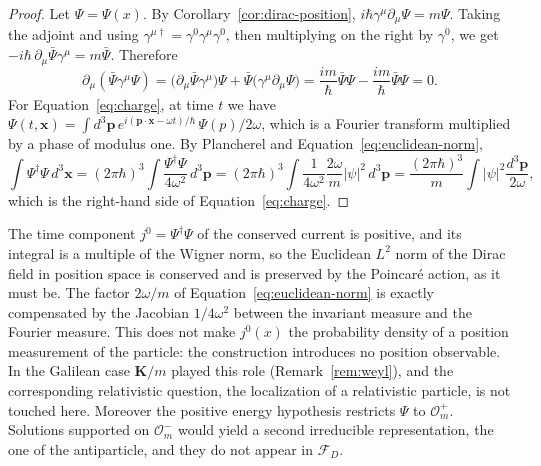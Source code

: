 	\begin{proof}
		Let $\Psi=\Psi(x)$. By Corollary~\ref{cor:dirac-position}, $i\hbar\gamma^\mu\partial_\mu\Psi=m\Psi$. Taking the adjoint and using $\gamma^{\mu\dagger}=\gamma^0\gamma^\mu\gamma^0$, then multiplying on the right by $\gamma^0$, we get $-i\hbar\,\partial_\mu\bar{\Psi}\gamma^\mu=m\bar{\Psi}$. Therefore
		\begin{equation*}
			\partial_\mu(\bar{\Psi}\gamma^\mu\Psi)=\big(\partial_\mu\bar{\Psi}\gamma^\mu\big)\Psi+\bar{\Psi}\big(\gamma^\mu\partial_\mu\Psi\big)=\frac{im}{\hbar}\bar{\Psi}\Psi-\frac{im}{\hbar}\bar{\Psi}\Psi=0.
		\end{equation*}
		For Equation~\eqref{eq:charge}, at time $t$ we have $\Psi(t,\mathbf{x})=\int d^3\mathbf{p}\,e^{i(\mathbf{p}\cdot\mathbf{x}-\omega t)/\hbar}\,\Psi(p)/2\omega$, which is a Fourier transform multiplied by a phase of modulus one. By Plancherel and Equation~\eqref{eq:euclidean-norm},
		\begin{equation*}
			\int\Psi^\dagger\Psi\,d^3\mathbf{x}=(2\pi\hbar)^3\int\frac{\Psi^\dagger\Psi}{4\omega^2}\,d^3\mathbf{p}=(2\pi\hbar)^3\int\frac{1}{4\omega^2}\frac{2\omega}{m}|\psi|^2\,d^3\mathbf{p}=\frac{(2\pi\hbar)^3}{m}\int|\psi|^2\frac{d^3\mathbf{p}}{2\omega},
		\end{equation*}
		which is the right-hand side of Equation~\eqref{eq:charge}.
	\end{proof}
	
	\begin{remark}\label{rem:probability-limits}
		The time component $j^0=\Psi^\dagger\Psi$ of the conserved current is positive, and its integral is a multiple of the Wigner norm, so the Euclidean $L^2$ norm of the Dirac field in position space is conserved and is preserved by the Poincar\'e action, as it must be. The factor $2\omega/m$ of Equation~\eqref{eq:euclidean-norm} is exactly compensated by the Jacobian $1/4\omega^2$ between the invariant measure and the Fourier measure. This does not make $j^0(x)$ the probability density of a position measurement of the particle: the construction introduces no position observable. In the Galilean case $\mathbf{K}/m$ played this role (Remark~\ref{rem:weyl}), and the corresponding relativistic question, the localization of a relativistic particle, is not touched here. Moreover the positive energy hypothesis restricts $\Psi$ to $\mathcal{O}_m^+$. Solutions supported on $\mathcal{O}_m^-$ would yield a second irreducible representation, the one of the antiparticle, and they do not appear in $\mathcal{F}_D$.
	\end{remark}
	
